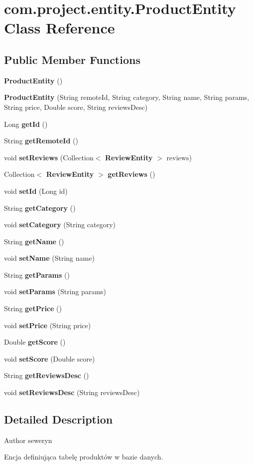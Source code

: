 \section{com.\+project.\+entity.\+Product\+Entity Class Reference}
\label{classcom_1_1project_1_1entity_1_1_product_entity}
\subsection*{Public Member Functions}
\begin{DoxyCompactItemize}
\item 
\textbf{ Product\+Entity} ()
\item 
\textbf{ Product\+Entity} (String remote\+Id, String category, String name, String params, String price, Double score, String reviews\+Desc)
\item 
Long \textbf{ get\+Id} ()
\item 
String \textbf{ get\+Remote\+Id} ()
\item 
void \textbf{ set\+Reviews} (Collection$<$ \textbf{ Review\+Entity} $>$ reviews)
\item 
Collection$<$ \textbf{ Review\+Entity} $>$ \textbf{ get\+Reviews} ()
\item 
void \textbf{ set\+Id} (Long id)
\item 
String \textbf{ get\+Category} ()
\item 
void \textbf{ set\+Category} (String category)
\item 
String \textbf{ get\+Name} ()
\item 
void \textbf{ set\+Name} (String name)
\item 
String \textbf{ get\+Params} ()
\item 
void \textbf{ set\+Params} (String params)
\item 
String \textbf{ get\+Price} ()
\item 
void \textbf{ set\+Price} (String price)
\item 
Double \textbf{ get\+Score} ()
\item 
void \textbf{ set\+Score} (Double score)
\item 
String \textbf{ get\+Reviews\+Desc} ()
\item 
void \textbf{ set\+Reviews\+Desc} (String reviews\+Desc)
\end{DoxyCompactItemize}


\subsection{Detailed Description}
\begin{DoxyAuthor}{Author}
seweryn
\end{DoxyAuthor}
Encja definiująca tabelę produktów w bazie danych. 

